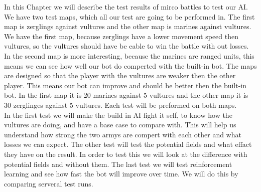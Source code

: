 In this Chapter we will describe the test results of mirco battles to test our AI. We have two test maps, which all our test are going to be performed in.
The first map is  zerglings against vultures and the other map is marines against vultures. We have the first map, because zerglings have a lower movement
speed then vultures, so the vultures should have be eable to win the battle with out losses. In the second map is more interesting, because the marines
are ranged units, this means we can see how well our bot do comperted with the built-in bot. The maps are  designed so that the player with the vultures
are weaker then the other player. This means our bot can improve and should be better then the built-in bot. In the first map it is 20 marines against 5
vultures and the other map it is 30 zerglinges against 5 vultures. Each test will be preformed on both maps. \\

 In the first test we will make the build in AI fight it self, to know how the vultures are doing, and have a base case to compare with. This will help us understand how strong the
two armys are compert with each other and what losses we can expect. The other test will test the potential fields and what effact they have on the result.
In order to test this we will look at the difference with potential fields and without them. The last test we will test reinforcement learning and see how
fast the bot will improve over time. We will do this by comparing serveral test runs.

